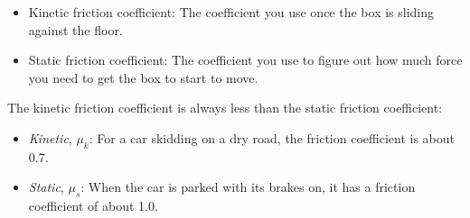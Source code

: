 \begin{itemize}
\item Kinetic friction coefficient: The coefficient you use once the box is sliding against the floor.
\item Static friction coefficient: The coefficient you use to figure out how much force you need to get the box to start to move.
\end{itemize}

The kinetic friction coefficient is always less than the static friction coefficient:
\begin{itemize}
\item \textit{Kinetic}, $\mu_k$: For a car skidding on a dry road, the friction coefficient is about 0.7.  
\item \textit{Static}, $\mu_s$: When the car is parked with its brakes on, it has a friction coefficient of about 1.0.
\end{itemize}

